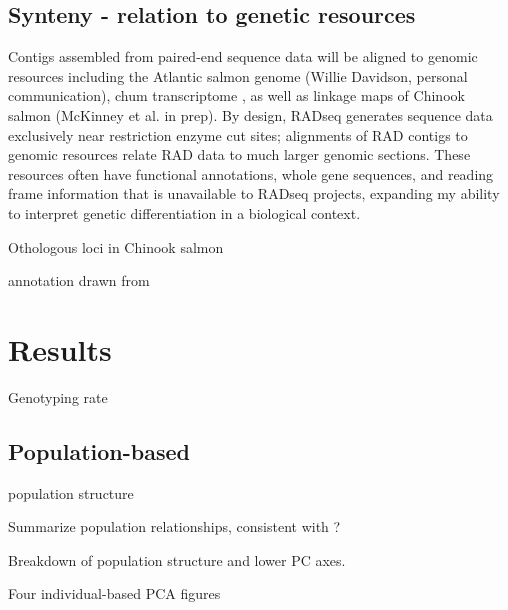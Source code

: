 \documentclass[12pt,  one column]{article}
\begin{document}
\subsection*{Synteny - relation to genetic resources}

Contigs assembled from paired-end sequence data \citet{Waples2015} will be aligned to genomic resources including the Atlantic salmon genome (Willie Davidson, personal communication), chum transcriptome \citep{Seeb2011}, as well as linkage maps of Chinook salmon (McKinney et al. in prep).  By design, RADseq generates sequence data exclusively near restriction enzyme cut sites; alignments of RAD contigs to genomic resources relate RAD data to much larger genomic sections.  These resources often have functional annotations, whole gene sequences, and reading frame information that is unavailable to RADseq projects, expanding my ability to interpret genetic differentiation in a biological context.

Othologous loci in Chinook salmon

annotation drawn from \citep{Waples2015}

\section*{Results}

Genotyping rate
\subsection*{Population-based}
population structure

Summarize population relationships, consistent with \citet{Small2014}?

Breakdown of population structure and lower PC axes.

Four individual-based PCA figures
\end{document}
